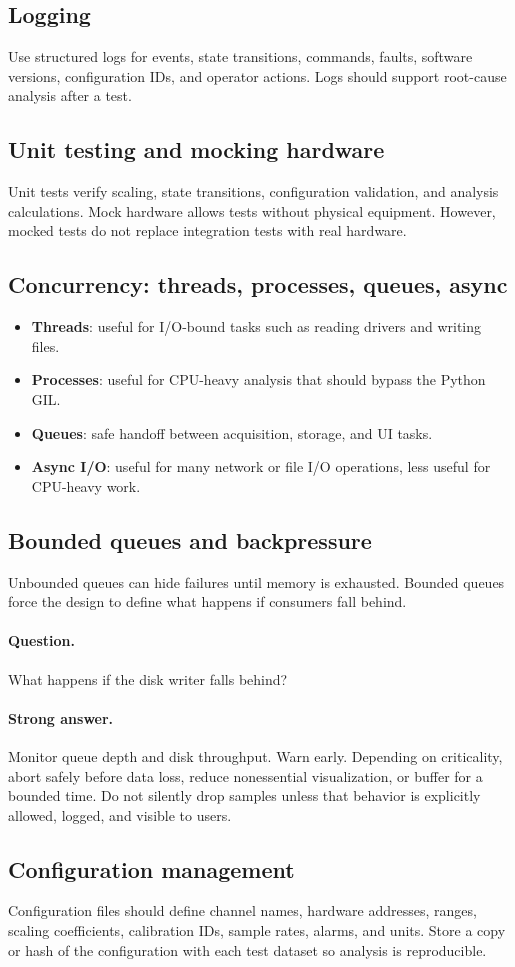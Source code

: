 \documentclass[11pt]{article}
\newcommand{\question}[1]{\paragraph{Question.} #1}
\newcommand{\stronganswer}[1]{\paragraph{Strong answer.} #1}
\begin{document}
\subsection{Logging}
Use structured logs for events, state transitions, commands, faults, software
versions, configuration IDs, and operator actions. Logs should support root-cause
analysis after a test.

\subsection{Unit testing and mocking hardware}
Unit tests verify scaling, state transitions, configuration validation, and
analysis calculations. Mock hardware allows tests without physical equipment.
However, mocked tests do not replace integration tests with real hardware.

\subsection{Concurrency: threads, processes, queues, async}
\begin{itemize}
  \item \textbf{Threads}: useful for I/O-bound tasks such as reading drivers and writing files.
  \item \textbf{Processes}: useful for CPU-heavy analysis that should bypass the Python GIL.
  \item \textbf{Queues}: safe handoff between acquisition, storage, and UI tasks.
  \item \textbf{Async I/O}: useful for many network or file I/O operations, less useful for CPU-heavy work.
\end{itemize}

\subsection{Bounded queues and backpressure}
Unbounded queues can hide failures until memory is exhausted. Bounded queues
force the design to define what happens if consumers fall behind.

\question{What happens if the disk writer falls behind?}
\stronganswer{Monitor queue depth and disk throughput. Warn early. Depending on
criticality, abort safely before data loss, reduce nonessential visualization,
or buffer for a bounded time. Do not silently drop samples unless that behavior
is explicitly allowed, logged, and visible to users.}

\subsection{Configuration management}
Configuration files should define channel names, hardware addresses, ranges,
scaling coefficients, calibration IDs, sample rates, alarms, and units. Store a
copy or hash of the configuration with each test dataset so analysis is
reproducible.
\end{document}
